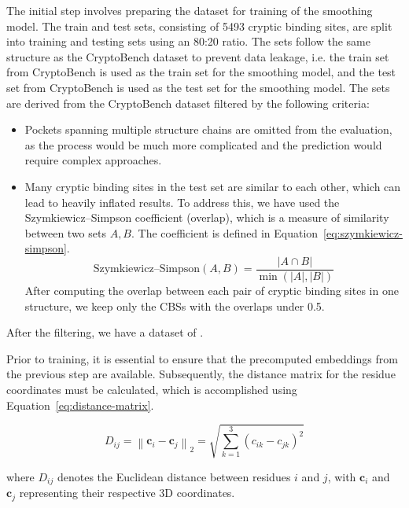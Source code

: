 The initial step involves preparing the dataset for training of the smoothing model. The train and test sets, consisting of 5493 cryptic binding sites, are split into training and testing sets using an 80:20 ratio. The sets follow the same structure as the CryptoBench dataset to prevent data leakage, i.e. the train set from CryptoBench is used as the train set for the smoothing model, and the test set from CryptoBench is used as the test set for the smoothing model. The sets are derived from the CryptoBench dataset filtered by the following criteria:

\begin{itemize}
    \item Pockets spanning multiple structure chains are omitted from the evaluation, as the process would be much more complicated and the prediction would require complex approaches.
    \item Many cryptic binding sites in the test set are similar to each other, which can lead to heavily inflated results. To address this, we have used the Szymkiewicz–Simpson coefficient (overlap), which is a measure of similarity between two sets $A, B$. The coefficient is defined in Equation~\ref{eq:szymkiewicz-simpson}.
    \begin{equation}
        \text{Szymkiewicz–Simpson}(A, B) = \frac{|A \cap B|}{\min(|A|, |B|)}
        \label{eq:szymkiewicz-simpson}
    \end{equation}
    After computing the overlap between each pair of cryptic binding sites in one structure, we keep only the CBSs with the overlaps under 0.5.
\end{itemize}

After the filtering, we have a dataset of .

Prior to training, it is essential to ensure that the precomputed embeddings from the previous step are available. Subsequently, the distance matrix for the residue coordinates must be calculated, which is accomplished using Equation~\ref{eq:distance-matrix}.

\begin{equation}
D_{ij} = \left\| \mathbf{c}_i - \mathbf{c}_j \right\|_2 = \sqrt{ \sum_{k=1}^3 (c_{ik} - c_{jk})^2 }
\label{eq:distance-matrix}
\end{equation}

where $D_{ij}$ denotes the Euclidean distance between residues $i$ and $j$, with $\mathbf{c}_i$ and $\mathbf{c}_j$ representing their respective 3D coordinates.

